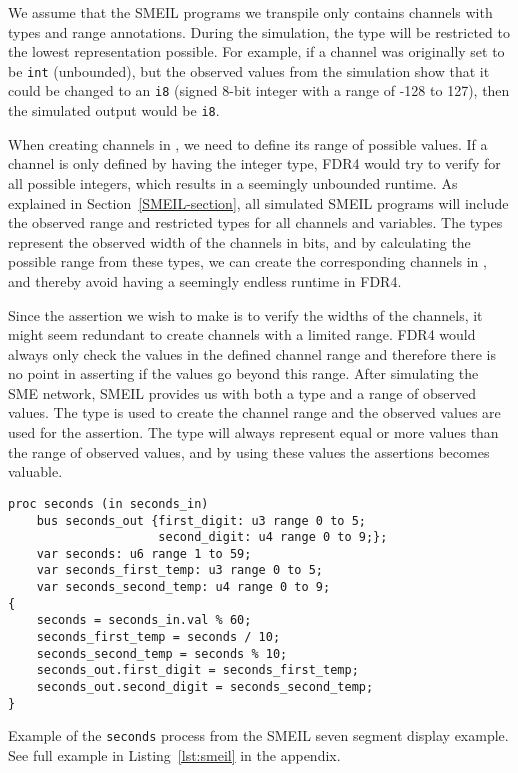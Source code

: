 We assume that the SMEIL programs we transpile only contains channels with types and range annotations. During the simulation, the type will be restricted to the lowest representation possible. For example, if a channel was originally set to be \texttt{int} (unbounded), but the observed values from the simulation show that it could be changed to an \texttt{i8} (signed 8-bit integer with a range of -128 to 127), then the simulated output would be \texttt{i8}.

When creating channels in \cspm{}, we need to define its range of possible values. If a channel is only defined by having the integer type, FDR4 would try to verify for all possible integers, which results in a seemingly unbounded runtime. As explained in Section~\ref{SMEIL-section}, all simulated SMEIL programs will include the observed range and restricted types for all channels and variables. The types represent the observed width of the channels in bits, and by calculating the possible range from these types, we can create the corresponding channels in \cspm{}, and thereby avoid having a seemingly endless runtime in FDR4.

Since the assertion we wish to make is to verify the widths of the channels, it might seem redundant to create \cspm{} channels with a limited range. FDR4 would always only check the values in the defined channel range and therefore there is no point in asserting if the values go beyond this range. After simulating the SME network, SMEIL provides us with both a type and a range of observed values. The type is used to create the \cspm{} channel range and the observed values are used for the assertion. The type will always represent equal or more values than the range of observed values, and by using these values the assertions becomes valuable.
\\

\begin{listing}
\begin{verbatim}
proc seconds (in seconds_in)
    bus seconds_out {first_digit: u3 range 0 to 5;
                     second_digit: u4 range 0 to 9;};
    var seconds: u6 range 1 to 59;
    var seconds_first_temp: u3 range 0 to 5;
    var seconds_second_temp: u4 range 0 to 9;
{
    seconds = seconds_in.val % 60;
    seconds_first_temp = seconds / 10;
    seconds_second_temp = seconds % 10;
    seconds_out.first_digit = seconds_first_temp;
    seconds_out.second_digit = seconds_second_temp;
}
\end{verbatim}
\caption{Example of the \texttt{seconds} process from the SMEIL seven segment display example. See full example in Listing~\ref{lst:smeil} in the appendix.}
\label{lst:range_smeil}
\end{listing}

